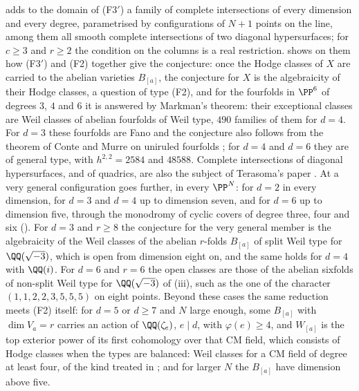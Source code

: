 \begin{remark}
\label{rem:vandermonde}
 adds to the domain of \textup{(F3$'$)} a family of
complete intersections of every dimension and every degree, parametrised by
configurations of $N+1$ points on the line, among them all smooth complete intersections of two diagonal
hypersurfaces; for $c\ge3$ and $r\ge2$ the condition on the columns is a real
restriction.  shows on them how \textup{(F3$'$)} and
(F2) together give the conjecture: once the Hodge classes of $X$ are
carried to the abelian varieties $B_{[a]}$, the conjecture for $X$ is the
algebraicity of their Hodge classes, a question of type (F2), and for the
fourfolds in $\PP^{6}$ of degrees $3$, $4$ and $6$ it is answered by
Markman's theorem: their exceptional classes are Weil classes of abelian
fourfolds of Weil type, $490$ families of them for $d=4$. For $d=3$ these
fourfolds are Fano and the conjecture also follows from the theorem of Conte
and Murre on uniruled fourfolds \cite{CM78}; for $d=4$ and $d=6$ they are of
general type, with $h^{2,2}=2584$ and $48588$. Complete intersections of
diagonal hypersurfaces, and of quadrics, are also the subject of Terasoma's
paper \cite{Ter88}. At a very general configuration
 goes further, in every $\PP^{N}$: for $d=2$ in every
dimension, for $d=3$ and $d=4$ up to dimension seven, and for $d=6$ up to
dimension five, through the monodromy of cyclic covers of degree three, four
and six (). For $d=3$ and $r\ge8$ the
conjecture for the very general member is the algebraicity of the Weil
classes of the abelian $r$-folds $B_{[a]}$ of split Weil type for
$\QQ(\sqrt{-3})$, which is open from dimension eight on, and the same holds
for $d=4$ with $\QQ(i)$. For $d=6$ and $r=6$ the open classes are those of
the abelian sixfolds of non-split Weil type for $\QQ(\sqrt{-3})$ of
(iii), such as the one of the character
$(1,1,2,2,3,5,5,5)$ on eight points. Beyond these cases the
same reduction meets (F2) itself: for $d=5$ or $d\ge7$ and $N$ large enough, some
$B_{[a]}$ with $\dim V_{a}=r$ carries an action of $\QQ(\zeta_{e})$, $e\mid d$,
with $\varphi(e)\ge4$, and $W_{[a]}$ is the top exterior power of its first
cohomology over that CM field, which consists of Hodge classes when the
types are balanced: Weil classes for a CM field of degree at least four, of
the kind treated in \cite[Theorem~1.1]{paperI}; and for larger $N$ the $B_{[a]}$ have
dimension above five.
\end{remark}

